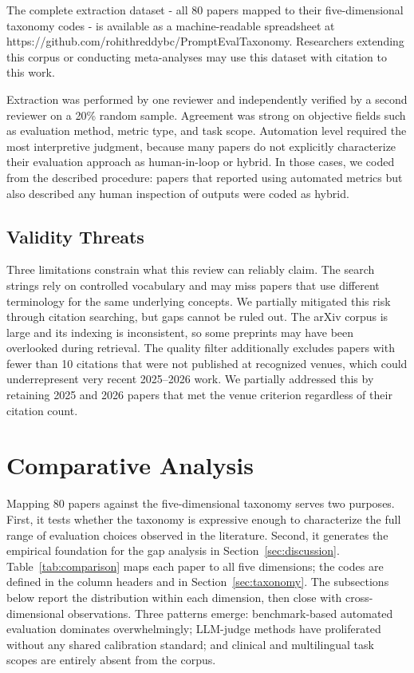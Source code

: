 \documentclass[journal]{IEEEtran}
\begin{document}
The complete extraction dataset - all 80 papers mapped to their
five-dimensional taxonomy codes - is available as a machine-readable
spreadsheet at https://github.com/rohithreddybc/PromptEvalTaxonomy. Researchers extending this
corpus or conducting meta-analyses may use this dataset with citation
to this work.

Extraction was performed by one reviewer and independently verified
by a second reviewer on a 20\% random sample. Agreement was strong on objective
fields such as evaluation method, metric type, and task scope. Automation
level required the most interpretive judgment, because many papers do
not explicitly characterize their evaluation approach as human-in-loop
or hybrid. In those cases, we coded from the described
procedure: papers that reported using automated metrics but also
described any human inspection of outputs were coded as hybrid.

\subsection{Validity Threats}

Three limitations constrain what this review can reliably claim. The search strings
rely on controlled vocabulary and may miss papers that use
different terminology for the same underlying concepts. We partially mitigated
this risk through citation searching, but gaps cannot be ruled out. The arXiv corpus
is large and its indexing is inconsistent, so some preprints may
have been overlooked during retrieval. The quality filter additionally excludes papers with
fewer than 10 citations that were not published at recognized venues,
which could underrepresent very recent 2025--2026 work. We partially addressed this by retaining 2025
and 2026 papers that met the venue criterion regardless of their
citation count.

\section{Comparative Analysis}
\label{sec:comparison}

Mapping 80 papers against the five-dimensional taxonomy serves
two purposes. First, it tests whether the taxonomy is expressive enough
to characterize the full range of evaluation choices observed in the
literature. Second, it generates the empirical foundation for the gap
analysis in Section~\ref{sec:discussion}. Table~\ref{tab:comparison} maps each
paper to all five dimensions; the codes are defined in the column
headers and in Section~\ref{sec:taxonomy}. The subsections below
report the distribution within each dimension, then close with
cross-dimensional observations. Three patterns emerge: benchmark-based
automated evaluation dominates overwhelmingly; LLM-judge methods have
proliferated without any shared calibration standard; and clinical and
multilingual task scopes are entirely absent from the corpus.
\end{document}
